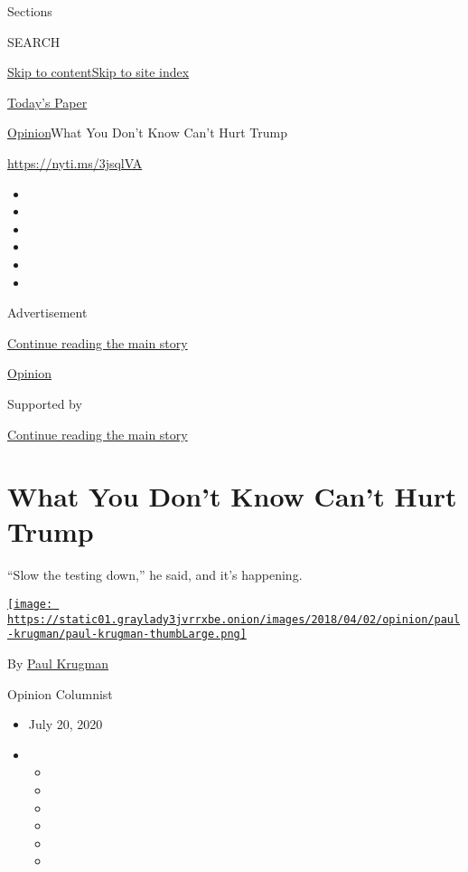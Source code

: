 Sections

SEARCH

\protect\hyperlink{site-content}{Skip to
content}\protect\hyperlink{site-index}{Skip to site index}

\href{https://myaccount.nytimes3xbfgragh.onion/auth/login?response_type=cookie\&client_id=vi}{}

\href{https://www.nytimes3xbfgragh.onion/section/todayspaper}{Today's
Paper}

\href{/section/opinion}{Opinion}\textbar{}What You Don't Know Can't Hurt
Trump

\url{https://nyti.ms/3jsqlVA}

\begin{itemize}
\item
\item
\item
\item
\item
\item
\end{itemize}

Advertisement

\protect\hyperlink{after-top}{Continue reading the main story}

\href{/section/opinion}{Opinion}

Supported by

\protect\hyperlink{after-sponsor}{Continue reading the main story}

\hypertarget{what-you-dont-know-cant-hurt-trump}{%
\section{What You Don't Know Can't Hurt
Trump}\label{what-you-dont-know-cant-hurt-trump}}

``Slow the testing down,'' he said, and it's happening.

\href{https://www.nytimes3xbfgragh.onion/by/paul-krugman}{\texttt{[image: https://static01.graylady3jvrrxbe.onion/images/2018/04/02/opinion/paul-krugman/paul-krugman-thumbLarge.png]}}

By \href{https://www.nytimes3xbfgragh.onion/by/paul-krugman}{Paul
Krugman}

Opinion Columnist

\begin{itemize}
\item
  July 20, 2020
\item
  \begin{itemize}
  \item
  \item
  \item
  \item
  \item
  \item
  \end{itemize}
\end{itemize}

